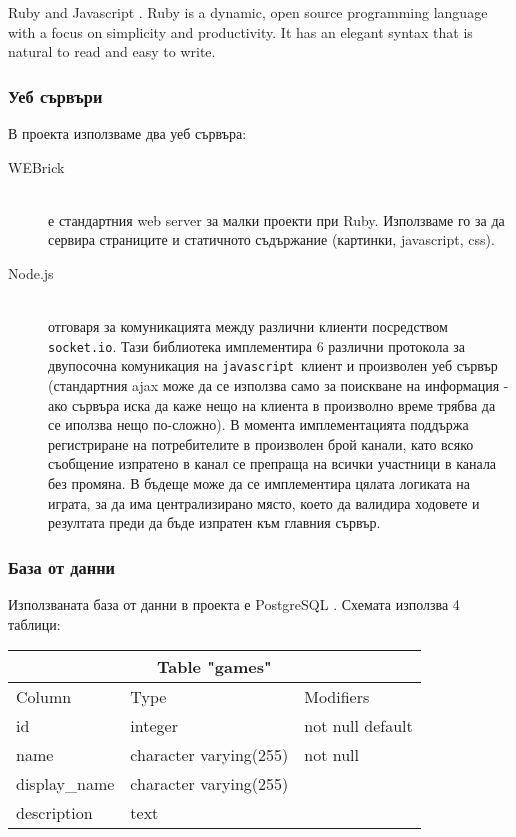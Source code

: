 \documentclass[a4paper]{article}
\def\js{\texttt{javascript}}
\begin{document}
Ruby \cite{ruby} and Javascript \cite{javascript}.
Ruby is a dynamic, open source programming language with a focus on simplicity and productivity. It has an elegant syntax that is natural to read and easy to write.

\subsubsection{Уеб сървъри}

  В проекта използваме два уеб сървъра:
  \begin{description}
    \item[WEBrick] \hfill \\ е стандартния web server за малки проекти при Ruby. Използваме го за да сервира страниците и статичното съдържание (картинки, javascript, css).
    \item[Node.js] \hfill \\ отговаря за комуникацията между различни клиенти посредством \texttt{socket.io}. Тази библиотека имплементира 6 различни протокола за двупосочна комуникация на \js\ клиент и произволен уеб сървър (стандартния ajax може да се използва само за поискване на информация - ако сървъра иска да каже нещо на клиента в произволно време трябва да се иползва нещо по-сложно). В момента имплементацията поддържа регистриране на потребителите в произволен брой канали, като всяко съобщение изпратено в канал се препраща на всички участници в канала без промяна. В бъдеще може да се имплементира цялата логиката на играта, за да има централизирано място, което да валидира ходовете и резултата преди да бъде изпратен към главния сървър.
  \end{description}

\subsubsection{База от данни}

Използваната база от данни в проекта е PostgreSQL \cite{postgresql}.
Схемата използва 4 таблици:

\begin{tabular} { | l | l | l | }
\multicolumn{3}{c}{Table "games"} \\
\hline
Column & Type & Modifiers \\
\hline
id & integer & not null default \\
name & character varying(255) & not null \\
display\_name & character varying(255) & \\
description & text & \\
\hline
\end{tabular}
\end{document}
